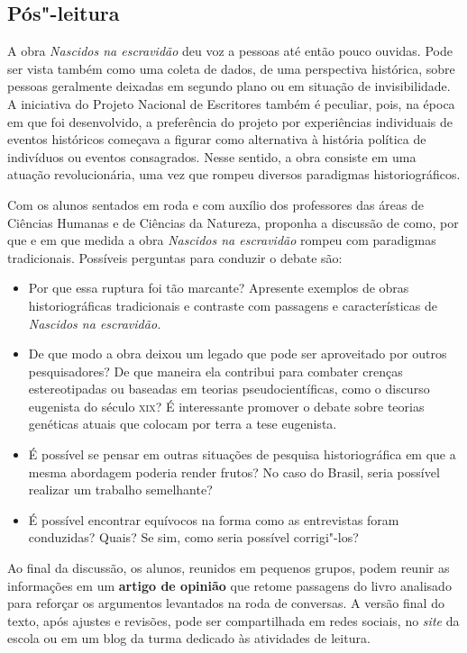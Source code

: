 \documentclass[11pt]{extarticle}
\begin{document}
\subsection{Pós"-leitura}

A obra \emph{Nascidos na escravidão} deu voz a pessoas até
então pouco ouvidas. Pode ser vista também como uma coleta de dados, de
uma perspectiva histórica, sobre pessoas geralmente deixadas em segundo
plano ou em situação de invisibilidade. A iniciativa do Projeto Nacional
de Escritores também é peculiar, pois, na época em que foi desenvolvido,
a preferência do projeto por experiências individuais de eventos
históricos começava a figurar como alternativa à história política de
indivíduos ou eventos consagrados. Nesse sentido, a obra consiste em uma
atuação revolucionária, uma vez que rompeu diversos paradigmas
historiográficos.

Com os alunos sentados em roda e com auxílio dos professores das áreas
de Ciências Humanas e de Ciências da Natureza, proponha a discussão de
como, por que e em que medida a obra \emph{Nascidos na escravidão}
rompeu com paradigmas tradicionais. Possíveis perguntas para conduzir o
debate são:

\begin{itemize}
\item
  Por que essa ruptura foi tão marcante? Apresente exemplos de obras
  historiográficas tradicionais e contraste com passagens e
  características de \emph{Nascidos na escravidão.}
\item
  De que modo a obra deixou um legado que pode ser aproveitado por
  outros pesquisadores? De que maneira ela contribui para combater
  crenças estereotipadas ou baseadas em teorias pseudocientíficas, como
  o discurso eugenista do século \textsc{xix}? É interessante promover o debate
  sobre teorias genéticas atuais que colocam por terra a tese eugenista.
\item
  É possível se pensar em outras situações de pesquisa historiográfica
  em que a mesma abordagem poderia render frutos? No caso do Brasil,
  seria possível realizar um trabalho semelhante?
\item
  É possível encontrar equívocos na forma como as entrevistas foram
  conduzidas? Quais? Se sim, como seria possível corrigi"-los?
\end{itemize}

Ao final da discussão, os alunos, reunidos em pequenos grupos, podem
reunir as informações em um \textbf{artigo de opinião} que retome
passagens do livro analisado para reforçar os argumentos levantados na
roda de conversas. A versão final do texto, após ajustes e revisões,
pode ser compartilhada em redes sociais, no \emph{site} da escola ou em
um blog da turma dedicado às atividades de leitura.
\end{document}
